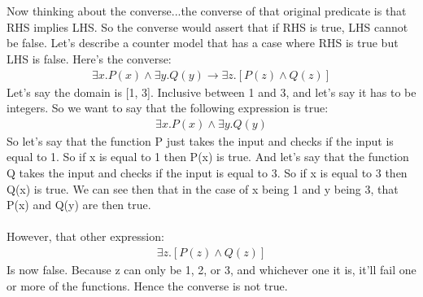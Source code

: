 \documentclass{article}
\begin{document}
\\
\\
Now thinking about the converse...the converse of that original predicate is that RHS implies LHS. So the converse would assert that if RHS is true, LHS cannot be false. Let's describe a counter model that has a case where RHS is true but LHS is false. Here's the converse:
\begin {align*}
\exists x. P(x) \wedge \exists y. Q(y) \rightarrow \exists z. [P(z) \wedge Q(z)] 
\end {align*}
Let's say the domain is [1, 3]. Inclusive between 1 and 3, and let's say it has to be integers. So we want to say that the following expression is true:
\begin {align*}
\exists x. P(x) \wedge \exists y. Q(y)
\end {align*}
So let's say that the function P just takes the input and checks if the input is equal to 1. So if x is equal to 1 then P(x) is true. And let's say that the function Q takes the input and checks if the input is equal to 3. So if x is equal to 3 then Q(x) is true. We can see then that in the case of x being 1 and y being 3, that P(x) and Q(y) are then true. 
\\
\\
However, that other expression:
\begin {align*}
\exists z. [P(z) \wedge Q(z)]
\end {align*}
Is now false. Because z can only be 1, 2, or 3, and whichever one it is, it'll fail one or more of the functions. 
Hence the converse is not true. 
\end{document}
